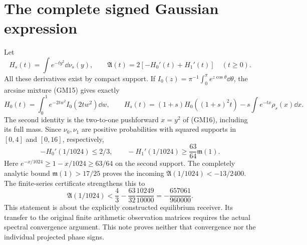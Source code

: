 \documentclass[11pt]{article}
\begin{document}
\section{The complete signed Gaussian expression}
Let
\begin{equation}\tag{GM23}
 H_s(t)=\int e^{-ty^2}\dd\nu_s(y),\qquad
 \mathfrak A(t)=2[-H_0'(t)+H_1'(t)]\quad(t\ge0).
\end{equation}
All these derivatives exist by compact support. If
$I_0(z)=\pi^{-1}\int_0^\pi e^{z\cos\theta}\dd\theta$, the arcsine
mixture (GM15) gives exactly
\begin{equation}\tag{GM24}
 H_0(t)=\int_0^1e^{-2tw^2}I_0(2tw^2)\dd w,\qquad
 H_s(t)=(1+s)H_0((1+s)^2t)-s\int e^{-tx}\rho_s(x)\dd x.
\end{equation}
The second identity is the two-to-one pushforward $x=y^2$ of (GM16),
including its full mass. Since $\nu_0,\nu_1$ are positive probabilities
with squared supports in $[0,4]$ and $[0,16]$, respectively,
\[
 -H_0'(1/1024)\le2/3,\qquad
 -H_1'(1/1024)\ge\frac{63}{64}\mathfrak m(1).
\]
Here $e^{-x/1024}\ge1-x/1024\ge63/64$ on the second support.
The completely analytic bound $\mathfrak m(1)>17/25$ proves the incoming
$\mathfrak A(1/1024)<-13/2400$. The finite-series certificate strengthens
this to
\begin{equation}\tag{GM25}
 \boxed{\mathfrak A(1/1024)
 <\frac43-\frac{63}{32}\frac{10249}{10000}
 =-\frac{657061}{960000}.}
\end{equation}
This statement is about the explicitly constructed equilibrium receiver.
Its transfer to the original finite arithmetic observation matrices
requires the actual spectral convergence argument. This note proves
neither that convergence nor the individual projected phase signs.
\end{document}
